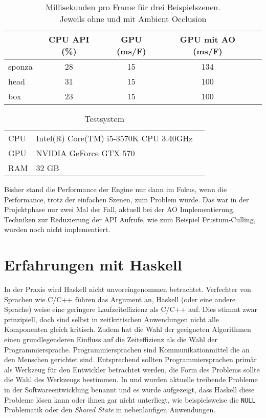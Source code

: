 \begin{table}[h]
\centering
\begin{tabular}{@{}lcccc@{}}
\toprule
       & CPU API (\%) & GPU (ms/F) & GPU mit \ac{AO} (ms/F) & \\ \midrule
sponza & 28  		  &  15  & 134  &  \\
head   & 31    		  &  15  & 100  &  \\
box    & 23    		  &  15  & 100  &  \\ \bottomrule
\end{tabular}
\caption{Millisekunden pro Frame für drei Beispielszenen.\\Jeweils ohne und mit Ambient Occlusion}\label{tab:performance}
\end{table}

\begin{table}[h]
\centering
\begin{tabular}{@{}llc@{}}
\toprule
CPU &  Intel(R) Core(TM) i5-3570K CPU \@ 3.40GHz  & \\
GPU &  NVIDIA GeForce GTX 570  & \\
RAM &  32 GB  & \\ \bottomrule
\end{tabular}
\caption{Testsystem}\label{tab:spec-system}
\end{table}

Bisher stand die Performance der Engine nur dann im Fokus, wenn die Performance, trotz der einfachen Szenen, zum Problem wurde. Das war in der Projektphase nur zwei Mal der Fall, aktuell bei der \ac{AO} Implementierung. Techniken zur Reduzierung der API Aufrufe, wie zum Beispiel Frustum-Culling, wurden noch nicht implementiert.

\section{Erfahrungen mit Haskell}\label{sec:xp-haskell}

In der Praxis wird Haskell nicht unvoreingenommen betrachtet. Verfechter von Sprachen wie C/C++ führen das Argument an, Haskell (oder eine andere Sprache) weise eine geringere Laufzeiteffizienz als C/C++ auf. Dies stimmt zwar prinzipiell, doch sind selbst in zeitkritischen Anwendungen nicht alle Komponenten gleich kritisch. Zudem hat die Wahl der geeigneten Algorithmen einen grundlegenderen Einfluss auf die Zeiteffizienz als die Wahl der Programmiersprache. Programmiersprachen sind Kommunikationmittel die an den Menschen gerichtet sind. Entsprechend sollten Programmiersprachen primär als Werkzeug für den Entwickler betrachtet werden, die Form des Problems sollte die Wahl des Werkzeugs bestimmen. In  und  wurden aktuelle treibende Probleme in der Softwareentwicklung benannt und es wurde aufgezeigt, dass Haskell diese Probleme lösen kann oder ihnen gar nicht unterliegt, wie beispielsweise die \texttt{NULL} Problematik oder den \textit{Shared State} in nebenläufigen Anwendungen.

